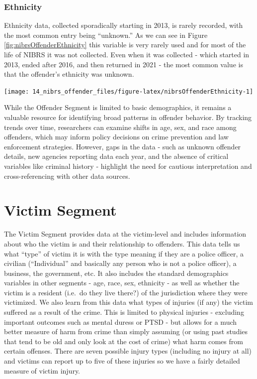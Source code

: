 \documentclass[
]{krantz}
\let\origfigure\figure
\let\endorigfigure\endfigure
\renewenvironment{figure}[1][2] {
    \expandafter\origfigure\expandafter[H]
} {
    \endorigfigure
}
\begin{document}
\subsection{Ethnicity}\label{ethnicity-2}

Ethnicity data, collected sporadically starting in 2013, is
rarely recorded, with the most common entry being
``unknown.'' As we can see in Figure
\ref{fig:nibrsOffenderEthnicity} this variable is very
rarely used and for most of the life of NIBRS it was not
collected. Even when it was collected - which started in
2013, ended after 2016, and then returned in 2021 - the most
common value is that the offender's ethnicity was unknown.

\begin{figure}

{\centering \texttt{[image: 14\_nibrs\_offender\_files/figure-latex/nibrsOffenderEthnicity-1]} 

}

\caption{The share of offenders by ethnicity, 1991-2022.}\label{fig:nibrsOffenderEthnicity}
\end{figure}

While the Offender Segment is limited to basic demographics,
it remains a valuable resource for identifying broad
patterns in offender behavior. By tracking trends over time,
researchers can examine shifts in age, sex, and race among
offenders, which may inform policy decisions on crime
prevention and law enforcement strategies. However, gaps in
the data - such as unknown offender details, new agencies
reporting data each year, and the absence of critical
variables like criminal history - highlight the need for
cautious interpretation and cross-referencing with other
data sources.

\chapter{Victim Segment}\label{victim-segment-1}

The Victim Segment provides data at the victim-level and
includes information about who the victim is and their
relationship to offenders. This data tells us what ``type''
of victim it is with the type meaning if they are a police
officer, a civilian (``Individual'' and basically any person
who is not a police officer), a business, the government,
etc. It also includes the standard demographics variables in
other segments - age, race, sex, ethnicity - as well as
whether the victim is a resident (i.e.~do they live there?)
of the jurisdiction where they were victimized. We also
learn from this data what types of injuries (if any) the
victim suffered as a result of the crime. This is limited to
physical injuries - excluding important outcomes such as
mental duress or PTSD - but allows for a much better measure
of harm from crime than simply assuming (or using past
studies that tend to be old and only look at the cost of
crime) what harm comes from certain offenses. There are
seven possible injury types (including no injury at all) and
victims can report up to five of these injuries so we have a
fairly detailed measure of victim injury.
\end{document}
